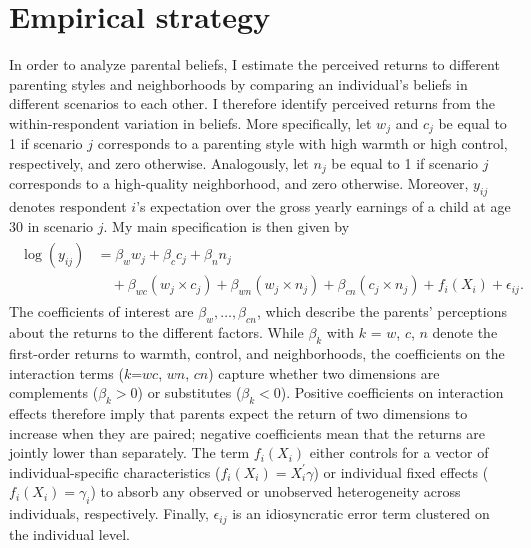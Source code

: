 \documentclass[12pt, a4paper, english]{article}
\begin{document}
\section{Empirical strategy}\label{sec:empiricalstrategy}
In order to analyze parental beliefs, I estimate the perceived returns to different parenting styles and neighborhoods by comparing an individual's beliefs in different scenarios to each other. I therefore identify perceived returns from the within-respondent variation in beliefs. More specifically, let $w_j$ and $c_j$ be equal to 1 if scenario $j$ corresponds to a parenting style with high warmth or high control, respectively, and zero otherwise. Analogously, let $n_j$ be equal to 1 if scenario $j$ corresponds to a high-quality neighborhood, and zero otherwise. Moreover, $y_{ij}$ denotes respondent $i$'s expectation over the gross yearly earnings of a child at age 30 in scenario $j$. My main specification is then given by
\begin{align}
    \begin{split}\label{eq:main}
  \log(y_{ij}) &= \beta_w w_j + \beta_c c_j + \beta_n n_j  \\
     &\quad + \beta_{wc} (w_j \times c_j) 
     + \beta_{wn} (w_j \times n_j) 
     + \beta_{cn} (c_j\times n_j) + f_i(X_i) + \epsilon_{ij}.
     \end{split}
\end{align} 
The coefficients of interest are $\beta_w,\ldots,\beta_{cn}$, which describe the parents' perceptions about the returns to the different factors. While $\beta_{k}$ with $k$ = $w$, $c$, $n$ denote the first-order returns to warmth, control, and neighborhoods, the coefficients on the interaction terms ($k$=$wc$, $wn$, $cn$) capture whether two dimensions are complements ($\beta_{k}>0$) or substitutes ($\beta_{k}<0$). Positive coefficients on interaction effects therefore imply that parents expect the return of two dimensions to increase when they are paired; negative coefficients mean that the returns are jointly lower than separately. The term $f_i(X_i)$ either controls for a vector of individual-specific characteristics ($f_i(X_i)=X_i^{\prime}\gamma$) or individual fixed effects ($f_i(X_i)=\gamma_i$) to absorb any observed or unobserved heterogeneity across individuals, respectively. Finally, $\epsilon_{ij}$ is an idiosyncratic error term clustered on the individual level. 
\end{document}
